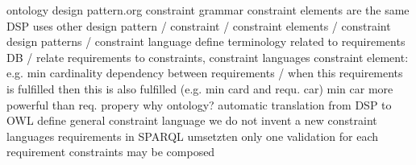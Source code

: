 \documentclass{llncs}
\begin{document}
ontology design pattern.org
constraint grammar
constraint elements are the same
DSP uses other design pattern / 
constraint / constraint elements / constraint design patterns / constraint language
define terminology
related to requirements DB / relate requirements to constraints, constraint languages
constraint element: e.g. min cardinality
dependency between requirements / when this requirements is fulfilled then this is also fulfilled (e.g. min card and requ. car)
min car more powerful than req. propery
why ontology? automatic translation from DSP to OWL 
define general constraint language
we do not invent a new constraint languages
requirements in SPARQL umsetzten
only one validation for each requirement
constraints may be composed 

{}

\setcounter{tocdepth}{1}
\end{document}
